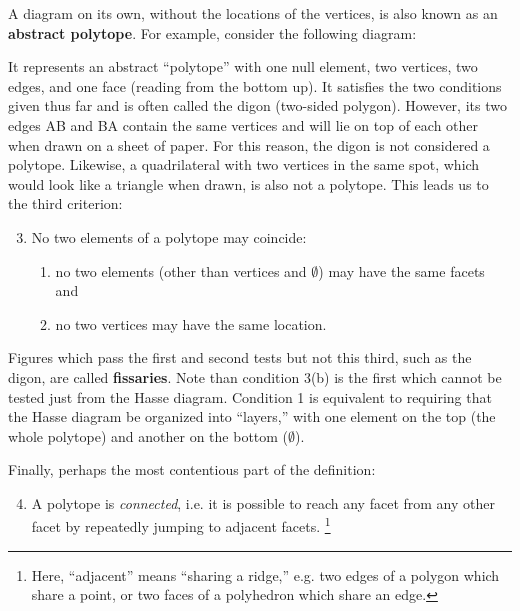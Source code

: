 \documentclass{article}
\begin{document}
A diagram on its own, without the locations of the vertices,
is also known as an \textbf{abstract polytope}.
For example, consider the following diagram:

\begin{center}
\end{center}

It represents an abstract ``polytope'' with
one null element, two vertices, two edges, and one face (reading from the bottom up).
It satisfies the two conditions given thus far and is often called the digon (two-sided polygon).
However, its two edges AB and BA contain the same vertices
and will lie on top of each other when drawn on a sheet of paper.
For this reason, the digon is not considered a polytope.
Likewise, a quadrilateral with two vertices in the same spot,
which would look like a triangle when drawn, is also not a polytope.
This leads us to the third criterion:

\begin{enumerate}
  \setcounter{enumi}{2}
  \item No two elements of a polytope may coincide:
  \begin{enumerate}
    \item no two elements (other than vertices and $\emptyset$) may have the same facets and
    \item no two vertices may have the same location.
  \end{enumerate}
\end{enumerate}

Figures which pass the first and second tests but not this third,
such as the digon, are called \textbf{fissaries}.
Note than condition 3(b) is the first which cannot be tested just from the Hasse diagram.
Condition 1 is equivalent to requiring that the Hasse diagram be organized into ``layers,''
with one element on the top (the whole polytope) and another on the bottom ($\emptyset$).

Finally, perhaps the most contentious part of the definition: 

\begin{enumerate}
  \setcounter{enumi}{3}
\item
  A polytope is \textit{connected}, i.e.
  it is possible to reach any facet from any other facet
  by repeatedly jumping to adjacent facets.
  \footnote{
    Here, ``adjacent'' means ``sharing a ridge,''
    e.g. two edges of a polygon which share a point,
    or two faces of a polyhedron which share an edge.
  }
\end{enumerate}
\end{document}

